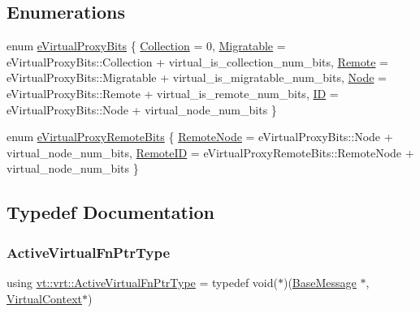 \subsection*{Enumerations}
\begin{DoxyCompactItemize}
\item 
enum \hyperlink{namespacevt_1_1vrt_a408950d7781cc0422dcc4bdf723fc281}{e\+Virtual\+Proxy\+Bits} \{ \newline
\hyperlink{namespacevt_1_1vrt_a408950d7781cc0422dcc4bdf723fc281a2f97fc194c438c28df53050b30e4228a}{Collection} = 0, 
\hyperlink{namespacevt_1_1vrt_a408950d7781cc0422dcc4bdf723fc281a243d421d4c34b16822e31ff39bc6c72d}{Migratable} = e\+Virtual\+Proxy\+Bits\+:\+:Collection + virtual\+\_\+is\+\_\+collection\+\_\+num\+\_\+bits, 
\hyperlink{namespacevt_1_1vrt_a408950d7781cc0422dcc4bdf723fc281ac81bc94ba7d9e2ef6791ddbd24daa667}{Remote} = e\+Virtual\+Proxy\+Bits\+:\+:Migratable + virtual\+\_\+is\+\_\+migratable\+\_\+num\+\_\+bits, 
\hyperlink{namespacevt_1_1vrt_a408950d7781cc0422dcc4bdf723fc281af813296532ba4d62a38c38700638a143}{Node} = e\+Virtual\+Proxy\+Bits\+:\+:Remote + virtual\+\_\+is\+\_\+remote\+\_\+num\+\_\+bits, 
\newline
\hyperlink{namespacevt_1_1vrt_a408950d7781cc0422dcc4bdf723fc281a5f8bd174c898ce0f41d7cd6f2747201f}{ID} = e\+Virtual\+Proxy\+Bits\+:\+:Node + virtual\+\_\+node\+\_\+num\+\_\+bits
 \}
\item 
enum \hyperlink{namespacevt_1_1vrt_a5a8105b744eec1e3d031c4cd92dece7e}{e\+Virtual\+Proxy\+Remote\+Bits} \{ \hyperlink{namespacevt_1_1vrt_a5a8105b744eec1e3d031c4cd92dece7ea8fb0adb36660bd05ba5033e93cc8c3f0}{Remote\+Node} = e\+Virtual\+Proxy\+Bits\+:\+:Node + virtual\+\_\+node\+\_\+num\+\_\+bits, 
\hyperlink{namespacevt_1_1vrt_a5a8105b744eec1e3d031c4cd92dece7eafa45aa15be6f922c8e1e4c78dbdad535}{Remote\+ID} = e\+Virtual\+Proxy\+Remote\+Bits\+:\+:Remote\+Node + virtual\+\_\+node\+\_\+num\+\_\+bits
 \}
\end{DoxyCompactItemize}


\subsection{Typedef Documentation}
\mbox{\label{namespacevt_1_1vrt_a53c67fe3c204169d703b59fc9fd3f06c}} 
\subsubsection{\texorpdfstring{Active\+Virtual\+Fn\+Ptr\+Type}{ActiveVirtualFnPtrType}}
{\footnotesize\ttfamily using \hyperlink{namespacevt_1_1vrt_a53c67fe3c204169d703b59fc9fd3f06c}{vt\+::vrt\+::\+Active\+Virtual\+Fn\+Ptr\+Type} = typedef void($\ast$)(\hyperlink{namespacevt_ac34f95a5e2b8109b55bfba52b074443d}{Base\+Message} $\ast$, \hyperlink{structvt_1_1vrt_1_1_virtual_context}{Virtual\+Context}$\ast$)}

